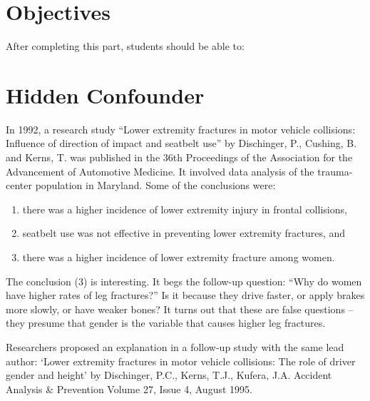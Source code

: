 \documentclass[11pt]{book}\usepackage[]{graphicx}\usepackage[]{color}
\begin{document}
\section{Objectives}

After completing this part, students should be able to:


\section{Hidden Confounder}  

In 1992, a research study ``Lower extremity fractures in motor vehicle collisions:
Influence of direction of impact and seatbelt use'' by Dischinger, P., Cushing, B. and Kerns, T. was published in the 36th Proceedings of the Association for the Advancement of Automotive Medicine.  It involved data analysis of the trauma-center population in Maryland.  Some of the conclusions were:

\begin{enumerate}
   \item there was a higher incidence of lower extremity injury in frontal collisions,
   \item seatbelt use was not effective in preventing lower extremity fractures, and
   \item there was a higher incidence of lower extremity fracture among women.
\end{enumerate}

The conclusion (3) is interesting.  It begs the follow-up question: ``Why do women have higher rates of leg fractures?''  Is it because they drive faster, or apply brakes more slowly, or have weaker bones?  It turns out that these are false questions -- they presume that gender is the variable that causes higher leg fractures.  

Researchers proposed an explanation in a follow-up study with the same lead author: `Lower extremity fractures in motor vehicle collisions: The role of driver gender and height' by Dischinger, P.C., Kerns, T.J., Kufera, J.A. Accident Analysis \& Prevention Volume 27, Issue 4, August 1995.
\end{document}
